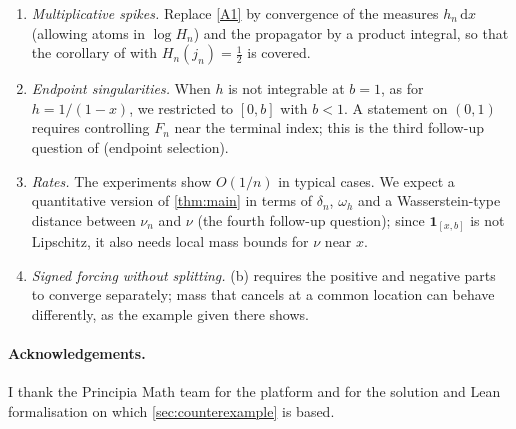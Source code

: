 \documentclass[11pt]{article}
\theoremstyle{definition}
\theoremstyle{remark}
\newcommand{\dd}{\,\mathrm{d}}
\newcommand{\1}{\mathbf{1}}
\begin{document}
\begin{enumerate}[leftmargin=2em,itemsep=2pt]
\item \emph{Multiplicative spikes.} Replace \ref{A1} by convergence of the measures $h_n\dd x$
(allowing atoms in $\log H_n$) and the propagator by a product integral, so that the corollary of
\cite{Pri26} with $H_n(j_n)=\frac12$ is covered.
\item \emph{Endpoint singularities.} When $h$ is not integrable at $b=1$, as for $h=1/(1-x)$,
we restricted to $[0,b]$ with $b<1$. A statement on $(0,1)$ requires controlling $F_n$ near the
terminal index; this is the third follow-up question of \cite{Pri26} (endpoint selection).
\item \emph{Rates.} The experiments show $O(1/n)$ in typical cases. We expect a quantitative version
of \cref{thm:main} in terms of $\delta_n$, $\omega_h$ and a Wasserstein-type distance between $\nu_n$
and $\nu$ (the fourth follow-up question); since $\1_{[x,b]}$ is not Lipschitz, it also needs local
mass bounds for $\nu$ near $x$.
\item \emph{Signed forcing without splitting.} (b) requires the positive and
negative parts to converge separately; mass that cancels at a common location can behave differently,
as the example given there shows.
\end{enumerate}

\paragraph{Acknowledgements.} I thank the Principia Math team for the platform and for the solution and
Lean formalisation \cite{Pri26,PriLean} on which \cref{sec:counterexample} is based.
\end{document}
